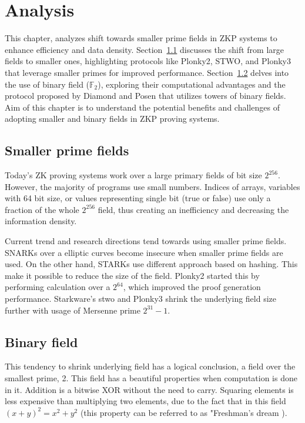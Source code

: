\chapter{Analysis}\label{analysis}

This chapter, analyzes shift towards smaller prime fields in
ZKP systems to enhance efficiency and data density.
Section~\ref{analysis:smaller-prime-fields} discusses the shift from large
fields to smaller ones, highlighting protocols like Plonky2, STWO, and Plonky3
that leverage smaller primes for improved performance. Section~\ref{analysis:binary-fields}
delves into the use of binary field ($\mathbb{F}_2$), exploring their
computational advantages and the protocol proposed by Diamond and Posen
\cite{Binius} that utilizes towers of binary fields. Aim of this chapter is to
understand the potential benefits and challenges of adopting smaller and
binary fields in ZKP proving systems.

\section{Smaller prime fields}\label{analysis:smaller-prime-fields}

Today's ZK proving systems work over a large primary fields of bit size $2^{256}$.
However, the majority of programs use small numbers. Indices of arrays,
variables with 64 bit size, or values representing single bit (true or false)
use only a fraction of the whole $2^{256}$ field, thus creating an inefficiency
and decreasing the information density.

Current trend and research directions tend towards using smaller prime fields.
SNARKs over a elliptic curves become insecure when smaller prime fields are used.
On the other hand, STARKs \cite{SassonSTARKs} use different approach based on hashing.
This make it possible to reduce the size of the field. Plonky2 \cite{Plonky2}
started this by performing calculation over a $2^{64}$, which improved the proof
generation performance. Starkware's stwo \cite{CircleStarks} and Plonky3 \cite{Plonky3}
shrink the underlying field size further with usage of Mersenne prime $2^{31} - 1$.

\section{Binary field}\label{analysis:binary-fields}

This tendency to shrink underlying field has a logical conclusion, a field over
the smallest prime, 2. This field has a beautiful properties when computation is
done in it. Addition is a bitwise XOR without the need to carry. Squaring elements
is less expensive than multiplying two elements, due to the fact that in this
field $(x + y)^2 = x^2 + y^2$ (this property can be referred to as "Freshman's
dream \cite{FreshmansDream}).


